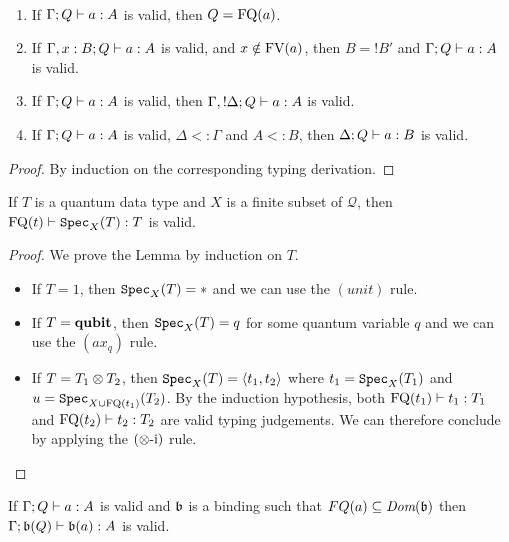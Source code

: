 \documentclass[twoside]{article}
\begin{document}
\begin{lemma}~
\label{prop_type_syst}
\begin{enumerate}
  \item If $\Gamma; Q \vdash a:A$ is valid, 
  then $Q=\mathop{\textrm{FQ}}\nolimits(a)$.\label{q_context}
  \item If $\Gamma,x:B;Q \vdash a:A$ is valid, 
  and $x\notin \mathop{\textrm{FV}}\nolimits(a)$, then $B={!}B'$ and 
  $\Gamma;Q \vdash a:A$ is valid.\label{unused_var}
  \item If $\Gamma; Q \vdash a:A$ is valid, 
  then $\Gamma, {!}\Delta ; Q \vdash a:A$ is valid.\label{weakening}
  \item If $\Gamma ; Q \vdash a:A$ is valid, $\Delta <: \Gamma$
  and $A<:B$, then $\Delta ; Q \vdash a:B$ is valid.\label{subtype}
\end{enumerate}
\end{lemma}

\begin{proof}
By induction on the corresponding typing derivation.
\end{proof}

\begin{lemma}
\label{specimen}
If $T$ is a quantum data type and $X$ is a finite subset of
$\mathcal{Q}$, then $\mathop{\textrm{FQ}}\nolimits(t)\vdash \texttt{Spec}_X(T):T$ is valid.
\end{lemma}

\begin{proof}
We prove the Lemma by induction on $T$.
  \begin{itemize}
    \item If $T=1$, then $\texttt{Spec}_X(T)=*$ and we can use the $(unit)$ rule.
    \item If $T=\textrm{\bf qubit}$, then $\texttt{Spec}_X(T)=q$ for some quantum variable $q$ and we can 
          use the $(ax_q)$ rule.
    \item If $T=T_1\otimes T_2$, then $\texttt{Spec}_X(T)=\langle t_1,t_2\rangle$ where $t_1=\texttt{Spec}_X(T_1)$ 
          and $u=\texttt{Spec}_{X\cup \mathop{\textrm{FQ}}\nolimits(t_1)}(T_2)$. By the induction hypothesis, both 
          $\mathop{\textrm{FQ}}\nolimits(t_1)\vdash t_1:T_1$ and $\mathop{\textrm{FQ}}\nolimits(t_2)\vdash t_2:T_2$ are valid typing 
          judgements. We can therefore conclude by applying the $(\otimes\mbox{-i})$ rule.
  \end{itemize}
\end{proof}

\begin{lemma}
\label{binding_judgement}
If $\Gamma;Q \vdash a:A$ is valid and $\mathfrak{b}$ is a 
binding such that $FQ(a)\subseteq\mathop{\textit{Dom}}\nolimits(\mathfrak{b})$ 
then $\Gamma;\mathfrak{b} (Q) \vdash \mathfrak{b}(a):A$ is valid.
\end{lemma}
\end{document}
